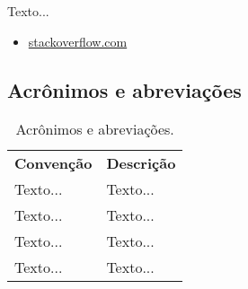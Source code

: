 Texto...

\begin{itemize}   
  \item \url{stackoverflow.com}
  \end{itemize}
\label{sub:bibliografia}

\newpage
\subsection{Acrônimos e abreviações} %
\begin{table}[h]
    \centering
    {\renewcommand\arraystretch{1.25}
       \caption{Acrônimos e abreviações.}
        \vspace{0.3cm}
       \begin{tabular}{ l l }
         \cline{1-1}\cline{2-2}  
         \multicolumn{1}{|p{3.850cm}|}{\textbf{Convenção} \centering } &
         \multicolumn{1}{p{8cm}|}{\textbf{Descrição} \centering }
           \\  
           \cline{1-1}\cline{2-2}  
          \multicolumn{1}{|p{3.850cm}|}{\vspace{0.3cm} Texto... \centering } &
           \multicolumn{1}{p{8cm}|}{Texto... \centering }
             \\  
             \cline{1-1}\cline{2-2}  
             \multicolumn{1}{|p{3.850cm}|}{\vspace{0.4cm} Texto... \centering } &
             \multicolumn{1}{p{8cm}|}{Texto... \centering }
               \\  
               \cline{1-1}\cline{2-2}  
               \multicolumn{1}{|p{3.850cm}|}{\vspace{0.1cm} Texto... \centering } &
               \multicolumn{1}{p{8cm}|}{Texto... \centering } 
              \\
               \cline{1-1}\cline{2-2}
               \multicolumn{1}{|p{3.850cm}|}{\vspace{0.1cm} Texto... \centering } & 
               \multicolumn{1}{p{8cm}|}{Texto... \centering }
                \\
                   \hline
                   
               \end{tabular} }
             \end{table}



\label{sub:acrônimos_e_abreviações}


